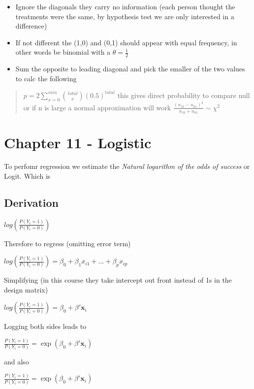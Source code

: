 \documentclass[
  letterpaper,
  DIV=11,
  numbers=noendperiod]{scrreprt}
\providecommand{\tightlist}{%
  \setlength{\itemsep}{0pt}\setlength{\parskip}{0pt}}\usepackage{longtable,booktabs,array}
\begin{document}
\begin{itemize}
\tightlist
\item
  Ignore the diagonals they carry no information (each person thought
  the treatments were the same, by hypothesis test we are only
  interested in a difference)
\item
  If not different the (1,0) and (0,1) should appear with equal
  frequency, in other words be binomial with a \(\theta = \frac{1}{2}\)
\item
  Sum the opposite to leading diagonal and pick the smaller of the two
  values to calc the following
\end{itemize}

\begin{quote}
\(p = 2 \sum^{min}_{x=0} {total \choose x}(0.5)^{total}\) this gives
direct probability to compare null or if n is large a normal
approximation will work
\(\frac{(n_{10} - n_{01})^2}{n_{10} + n_{01}}\sim \chi^2\)
\end{quote}

\hypertarget{chapter-11---logistic}{%
\section{Chapter 11 - Logistic}\label{chapter-11---logistic}}

To perfomr regression we estimate the \emph{Natural logarithm of the
odds of success} or Logit. Which is

\hypertarget{derivation}{%
\subsection{Derivation}\label{derivation}}

\(log(\frac{P(Y_i = 1)}{P(Y_i = 0)})\)

Therefore to regress (omitting error term)

\(log(\frac{P(Y_i = 1)}{P(Y_i = 0)}) = \beta_0 + \beta_1x_{i1} + ... + \beta_px_{ip}\)

Simplifying (in this course they take intercept out front instead of 1s
in the design matrix)

\(log(\frac{P(Y_i = 1)}{P(Y_i = 0)}) = \beta_0 + \beta'\mathbf{x}_i\)

Logging both sides leads to

\(\frac{P(Y_i = 1)}{P(Y_i = 0)} = \exp(\beta_0 + \beta'\mathbf{x}_i)\)

and also

\(\frac{P(Y_i = 1)}{P(Y_i = 0)} = \exp(\beta_0 + \beta'\mathbf{x}_i)\)
\end{document}
